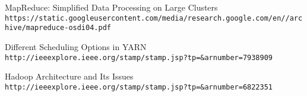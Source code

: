 \begin{thebibliography}{9}

MapReduce: Simplified Data Processing on Large Clusters
\\\texttt{https://static.googleusercontent.com/media/research.google.com/en//archive/mapreduce-osdi04.pdf}

Different Scheduling Options in YARN
\\\texttt{http://ieeexplore.ieee.org/stamp/stamp.jsp?tp=\&arnumber=7938909}

Hadoop Architecture and Its Issues
\\\texttt{http://ieeexplore.ieee.org/stamp/stamp.jsp?tp=\&arnumber=6822351}

\end{thebibliography}
